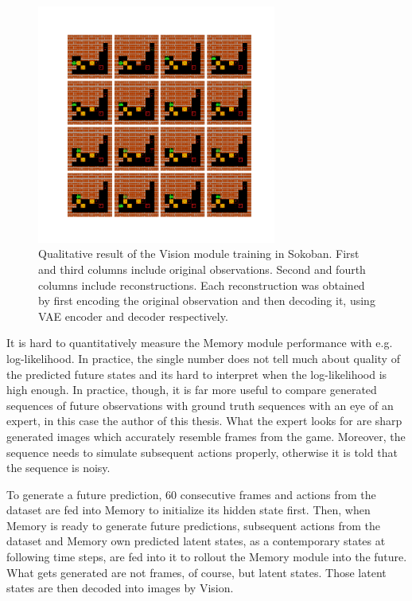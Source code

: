 \begin{figure}[H]
\includegraphics[width=0.7\textwidth,keepaspectratio]{figures/Sokoban_vision.png}
\caption[Qualitative result of the World Models' Vision module training in Sokoban]{Qualitative result of the Vision module training in Sokoban. First and third columns include original observations. Second and fourth columns include reconstructions. Each reconstruction was obtained by first encoding the original observation and then decoding it, using VAE encoder and decoder respectively.}
\label{Fig.WM_Sokoban_vision}
\end{figure}

It is hard to quantitatively measure the Memory module performance with e.g. log-likelihood. In practice, the single number does not tell much about quality of the predicted future states and its hard to interpret when the log-likelihood is high enough. In practice, though, it is far more useful to compare generated sequences of future observations with ground truth sequences with an eye of an expert, in this case the author of this thesis. What the expert looks for are sharp generated images which accurately resemble frames from the game. Moreover, the sequence needs to simulate subsequent actions properly, otherwise it is told that the sequence is noisy.

To generate a future prediction, 60 consecutive frames and actions from the dataset are fed into Memory to initialize its hidden state first. Then, when Memory is ready to generate future predictions, subsequent actions from the dataset and Memory own predicted latent states, as a contemporary states at following time steps, are fed into it to rollout the Memory module into the future. What gets generated are not frames, of course, but latent states. Those latent states are then decoded into images by Vision.

